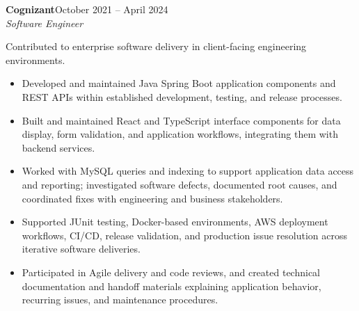 \documentclass[11pt,letterpaper]{article}
\newcommand{\entry}[3]{\needspace{11\baselineskip}\noindent\textbf{#1}\hfill #3\\[-1pt]\textit{#2}\par}
\begin{document}
\entry{Cognizant}{Software Engineer}{October 2021 -- April 2024}
Contributed to enterprise software delivery in client-facing engineering environments.
\begin{itemize}
\item Developed and maintained Java Spring Boot application components and REST APIs within established development, testing, and release processes.
\item Built and maintained React and TypeScript interface components for data display, form validation, and application workflows, integrating them with backend services.
\item Worked with MySQL queries and indexing to support application data access and reporting; investigated software defects, documented root causes, and coordinated fixes with engineering and business stakeholders.
\item Supported JUnit testing, Docker-based environments, AWS deployment workflows, CI/CD, release validation, and production issue resolution across iterative software deliveries.
\item Participated in Agile delivery and code reviews, and created technical documentation and handoff materials explaining application behavior, recurring issues, and maintenance procedures.
\end{itemize}\vspace{2pt}
\end{document}

